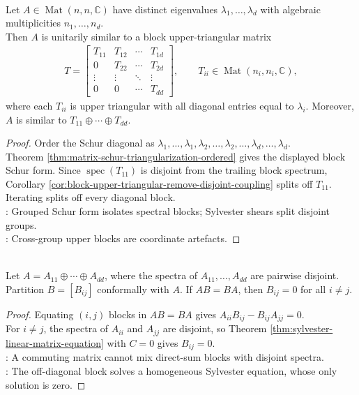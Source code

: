 \begin{theorem} \label{thm:schur-block-form-by-eigenvalue-groups} \\
Let $A\in\operatorname{Mat}(n,n,\mathbb{C})$ have distinct eigenvalues $\lambda_1,\ldots,\lambda_d$ with algebraic multiplicities $n_1,\ldots,n_d$.\\
Then $A$ is unitarily similar to a block upper-triangular matrix
\begin{align}
T=
\begin{bmatrix}
T_{11}&T_{12}&\cdots&T_{1d}\\
0&T_{22}&\cdots&T_{2d}\\
\vdots&\vdots&\ddots&\vdots\\
0&0&\cdots&T_{dd}
\end{bmatrix},
\qquad
T_{ii}\in\operatorname{Mat}(n_i,n_i,\mathbb{C}),
\nonumber
\end{align}
where each $T_{ii}$ is upper triangular with all diagonal entries equal to $\lambda_i$. Moreover, $A$ is similar to $T_{11}\oplus\cdots\oplus T_{dd}$.
\begin{proof}
Order the Schur diagonal as $\lambda_1,\ldots,\lambda_1,\lambda_2,\ldots,\lambda_2,\ldots,\lambda_d,\ldots,\lambda_d$.\\
Theorem \ref{thm:matrix-schur-triangularization-ordered} gives the displayed block Schur form. Since $\operatorname{spec}(T_{11})$ is disjoint from the trailing block spectrum, Corollary \ref{cor:block-upper-triangular-remove-disjoint-coupling} splits off $T_{11}$. Iterating splits off every diagonal block.\\
: Grouped Schur form isolates spectral blocks; Sylvester shears split disjoint groups.\\
: Cross-group upper blocks are coordinate artefacts.
\end{proof}
\end{theorem}

\begin{corollary} \label{cor:commuting-with-disjoint-blocks-has-zero-off-diagonal-blocks} \\
Let $A=A_{11}\oplus\cdots\oplus A_{dd}$, where the spectra of $A_{11},\ldots,A_{dd}$ are pairwise disjoint.\\
Partition $B=[B_{ij}]$ conformally with $A$. If $AB=BA$, then $B_{ij}=0$ for all $i\neq j$.
\begin{proof}
Equating $(i,j)$ blocks in $AB=BA$ gives $A_{ii}B_{ij}-B_{ij}A_{jj}=0$.\\
For $i\neq j$, the spectra of $A_{ii}$ and $A_{jj}$ are disjoint, so Theorem \ref{thm:sylvester-linear-matrix-equation} with $C=0$ gives $B_{ij}=0$.\\
: A commuting matrix cannot mix direct-sum blocks with disjoint spectra.\\
: The off-diagonal block solves a homogeneous Sylvester equation, whose only solution is zero.
\end{proof}
\end{corollary}

